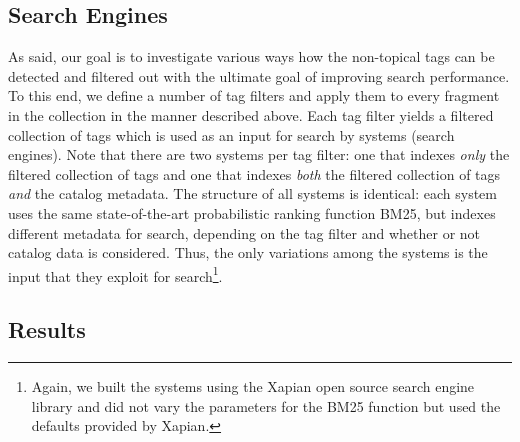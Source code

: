 \subsection{Search Engines}
As said, our goal is to investigate various ways how the non-topical tags can be detected and filtered out with the ultimate goal of improving search performance. To this end, we define a number of tag filters and apply them to every fragment in the collection in the manner described above. Each tag filter yields a filtered collection of tags which is used as an input for search by systems (search engines). Note that there are two systems per tag filter: one that indexes \textit{only} the filtered collection of tags and one that indexes \textit{both} the filtered collection of tags \textit{and} the catalog metadata. The structure of all systems is identical: each system uses the same state-of-the-art probabilistic ranking function BM25, but indexes different metadata for search, depending on the tag filter and whether or not catalog data is considered. Thus, the only variations among the systems is the input that they exploit for search\footnote{Again, we built the systems using the Xapian open source search engine library and did not vary the parameters for the BM25 function but used the defaults provided by Xapian.}.

\subsection{Results} \label{filter:sec:res}

